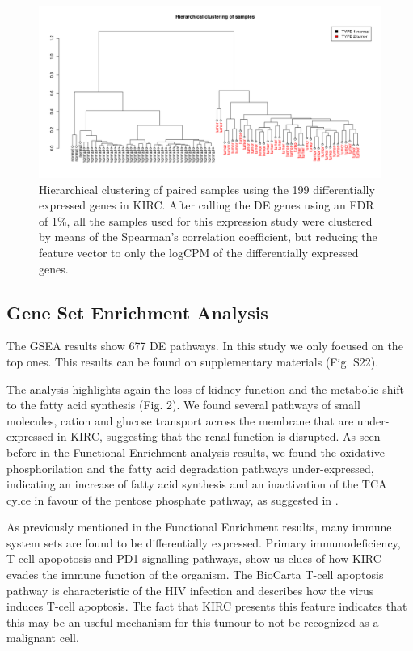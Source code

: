 \documentclass[9pt,twocolumn,twoside]{gsajnl}
\begin{document}
\begin{figure}[htbp]
\centering
\includegraphics[width=\textwidth]{figures/fig2.png}
\caption{Hierarchical clustering of paired samples using the 199 differentially expressed genes in KIRC. After calling the DE genes using an FDR of 1\%, all the samples used for this expression study were clustered by means of the Spearman's correlation coefficient, but reducing the feature vector to only the logCPM of the differentially expressed genes. }%
\label{fig:spectrum}
\end{figure}


\subsection*{Gene Set Enrichment Analysis}
The GSEA results show 677 DE pathways. In this study we only focused on the top ones. This results can be found on supplementary materials (Fig. S22).

The analysis highlights again the loss of kidney function and the metabolic shift to the fatty acid synthesis  (Fig. 2). We found several pathways of small molecules, cation and glucose transport across the membrane that are under-expressed in KIRC, suggesting that the renal function is disrupted. As seen before in the Functional Enrichment analysis results, we found the oxidative phosphorilation and the fatty acid degradation pathways under-expressed, indicating an increase of fatty acid synthesis and  an inactivation of the TCA cylce in favour of the pentose phosphate pathway, as suggested in \citep{Creighton2013}. 

As previously mentioned in the Functional Enrichment results, many immune system sets are found to be differentially expressed. Primary immunodeficiency, T-cell apopotosis and PD1 signalling pathways, show us clues of how KIRC evades the immune function of the organism. The BioCarta T-cell apoptosis pathway is characteristic of the HIV infection and describes how the virus induces T-cell apoptosis. The fact that KIRC presents this feature indicates that this may be an useful mechanism for this tumour to not be recognized as a malignant cell.
\end{document}
